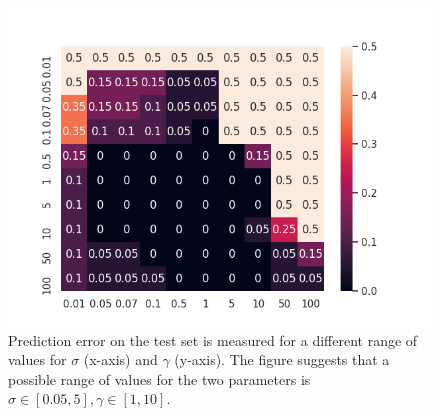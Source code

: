 \documentclass{article}
\begin{document}
\begin{figure}[]

            \includegraphics[width=\linewidth]{cgama}
      
        \caption{ Prediction error on the test set is measured for a different range of values for $\sigma$ (x-axis) and $\gamma$ (y-axis). The figure suggests that a possible range of values for the two parameters is $\sigma \in [0.05,5], \gamma \in [1,10]$.   }        
        
              
        \label{fig:cgama}
    \end{figure}
\end{document}
